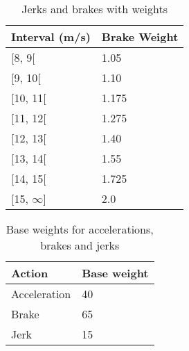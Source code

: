 \begin{table}
    \centering
    \begin{tabular}{|ll|}
    \hline
    \rowcolor{tablegreen}
    \textbf{Interval (m/s)} & \textbf{Brake Weight} \\ \hline
    {[}8, 9{[}              & 1.05 			             \\
    {[}9, 10{[}             & 1.10			              \\
    {[}10, 11{[}            & 1.175   		           \\
    {[}11, 12{[}            & 1.275  		            \\
    {[}12, 13{[}            & 1.40   		          \\
    {[}13, 14{[}            & 1.55    		          \\
    {[}14, 15{[}            & 1.725  		            \\
    {[}15, $\infty${]}      & 2.0    	   	       \\ \hline
    \end{tabular}
    \caption{Jerks and brakes with weights}
    \label{tab:jerkbrakenvalues}
\end{table}

\begin{table}
    \centering
    \begin{tabular}{|ll|}
    \hline
    \rowcolor{tablegreen}
    \textbf{Action} & \textbf{Base weight} \\ \hline
    Acceleration    & 40                   \\
    Brake           & 65                   \\
    Jerk            & 15                 \\ \hline
    \end{tabular}
    \caption{Base weights for accelerations, brakes and jerks}
    \label{tab:basevalues}
\end{table}